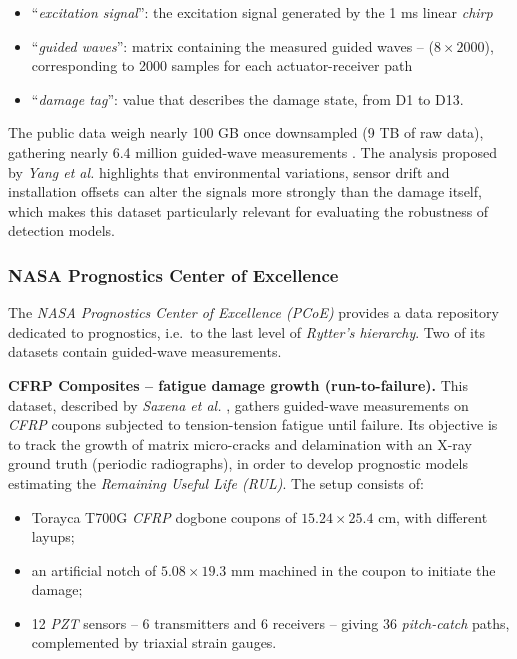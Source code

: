\documentclass[12pt]{article}
\begin{document}
\begin{itemize}[itemsep=8pt]
 
    \item ``\textit{excitation signal}'': the excitation signal generated by the 1 ms linear \textit{chirp}
 
    \item ``\textit{guided waves}'': matrix containing the measured guided waves -- ($8 \times 2000$), corresponding to 2000 samples for each actuator-receiver path
 
    \item ``\textit{damage tag}'': value that describes the damage state, from D1 to D13.
 
\end{itemize}
 
The public data weigh nearly 100 GB once downsampled (9 TB of raw data), gathering nearly 6.4 million guided-wave measurements \cite{yang2025longterm_data}. The analysis proposed by \textit{Yang et al.} \cite{Yang2025} highlights that environmental variations, sensor drift and installation offsets can alter the signals more strongly than the damage itself, which makes this dataset particularly relevant for evaluating the robustness of detection models.
 
\subsubsection{NASA Prognostics Center of Excellence}
 
The \textit{NASA Prognostics Center of Excellence (PCoE)} provides a data repository dedicated to prognostics, i.e.\ to the last level of \textit{Rytter's hierarchy}. Two of its datasets contain guided-wave measurements.
 
 
\textbf{CFRP Composites -- fatigue damage growth (run-to-failure).} This dataset, described by \textit{Saxena et al.} \cite{saxena2011composites, nasa_cfrp_dataset}, gathers guided-wave measurements on \textit{CFRP} coupons subjected to tension-tension fatigue until failure. Its objective is to track the growth of matrix micro-cracks and delamination with an X-ray ground truth (periodic radiographs), in order to develop prognostic models estimating the \textit{Remaining Useful Life (RUL)}. The setup consists of:
 
    \begin{itemize}[itemsep=4pt]
    
        \item Torayca T700G \textit{CFRP} dogbone coupons of $15.24 \times 25.4$ cm, with different layups;
        
        \item an artificial notch of $5.08 \times 19.3$ mm machined in the coupon to initiate the damage;
        
        \item 12 \textit{PZT} sensors -- 6 transmitters and 6 receivers -- giving 36 \textit{pitch-catch} paths, complemented by triaxial strain gauges.
        
    \end{itemize}
 
\end{document}
